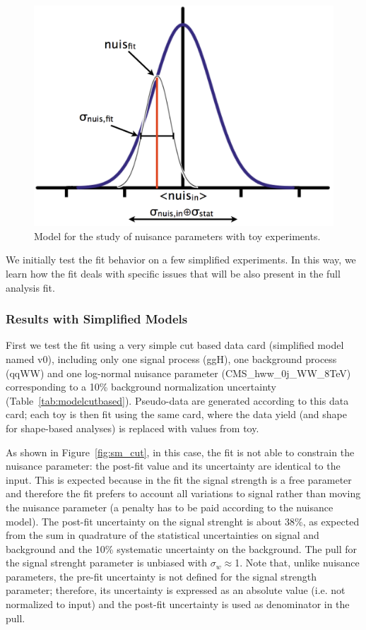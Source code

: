 \begin{figure}[!hbtp]
\centering
\includegraphics[width=.45\textwidth]{figures/nuismodel.png}
\caption{Model for the study of nuisance parameters with toy experiments.}
\label{fig:nuismodel}
\end{figure}

We initially test the fit behavior on a few simplified experiments. 
In this way, we learn how the fit deals with specific issues that will be also present in the full analysis fit.

\subsubsection{Results with Simplified Models}

First we test the fit using a very simple cut based data card (simplified model named v0), 
including only one signal process (ggH), one background process (qqWW) and one log-normal nuisance parameter (CMS\_hww\_0j\_WW\_8TeV)
corresponding to a 10\% background normalization uncertainty  (Table~\ref{tab:modelcutbased}).
Pseudo-data are generated according to this data card; each toy is then fit using the same card, where the data 
yield (and shape for shape-based analyses) is replaced with values from toy.

As shown in Figure~\ref{fig:sm_cut}, in this case, the fit is not able to constrain the nuisance parameter: 
the post-fit value and its uncertainty are identical to the input. 
This is expected because in the fit the signal strength is a free parameter and therefore the 
fit prefers to account all variations to signal rather than moving the nuisance parameter (a penalty has to be paid according to the nuisance model). 
The post-fit uncertainty on the signal strenght is about 38\%, as expected from the sum in quadrature of the statistical 
uncertainties on signal and background and the 10\% systematic uncertainty on the background.
The pull for the signal strenght parameter is unbiased with $\sigma_{w}$$\approx$1. 
Note that, unlike nuisance parameters, the pre-fit uncertainty is not defined for the signal strength parameter; 
therefore, its uncertainty is expressed as an absolute value (i.e. not normalized to input) and the post-fit uncertainty is used as denominator in the pull. 

